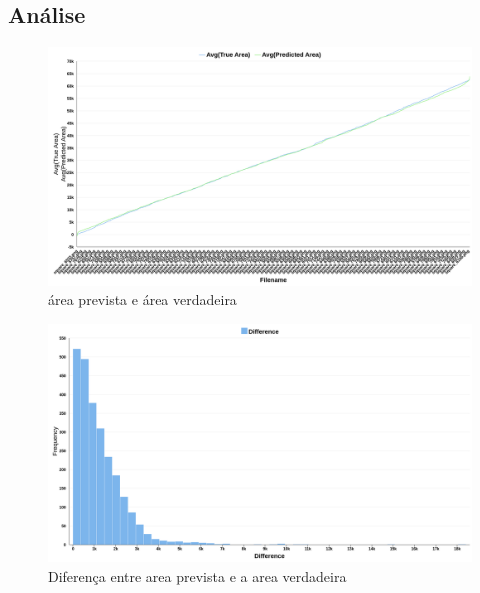  \subsection{Análise}       
        \begin{figure}[H]
	        \centering
	        \includegraphics[width=1.0\linewidth]{imgs/Test_8/area_predict_true_line.png}
	          \caption{área prevista e área verdadeira}
	        \label{fig:enter-label}
        \end{figure}
        \begin{figure}[H]
	        \centering
	        \includegraphics[width=1.0\linewidth]{imgs/Test_8/area_diference_hist.png}
	        \caption{Diferença entre area prevista e a area verdadeira}
	        \label{fig:enter-label}
    \end{figure}
    